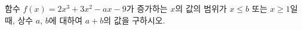 함수 $f(x)=2x^3+3x^2-ax-9$가 증가하는 $x$의 값의 범위가 $x\le b$ 또는 $x\ge 1$일 때, 상수 $a$, $b$에 대하여 $a+b$의 값을 구하시오. 
